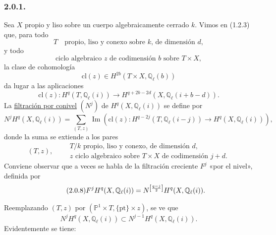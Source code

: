 \subsubsection*{2.0.1.}
Sea $X$ propio y liso sobre un cuerpo algebraicamente cerrado $k$. Vimos
en (1.2.3) que, para todo
\begin{equation}\tag{2.0.2}
T\quad\text{propio, liso y conexo sobre $k$, de dimensión $d$},
\end{equation}
y todo
\begin{equation}\tag{2.0.3}
\text{ciclo algebraico $z$ de codimensión $b$ sobre $T\times X$},
\end{equation}
la clase de cohomología
\begin{equation}\tag{2.0.4}
\mathrm{cl}(z)\in H^{2b}(T\times X,\mathbb Q_\ell(b))
\end{equation}
da lugar a las aplicaciones
\begin{equation}\tag{2.0.5}
\mathrm{cl}(z):H^q(T,\mathbb Q_\ell(i))\longrightarrow
H^{q+2b-2d}(X,\mathbb Q_\ell(i+b-d)).
\end{equation}
La \underline{filtración por conivel} $(N^j)$ de
$H^q(X,\mathbb Q_\ell(i))$ se define por
\begin{equation}\tag{2.0.6}
N^jH^q(X,\mathbb Q_\ell(i))
=\sum_{(T,z)}\operatorname{Im}\!\left(
\mathrm{cl}(z):H^{q-2j}(T,\mathbb Q_\ell(i-j))
\longrightarrow H^q(X,\mathbb Q_\ell(i))\right),
\end{equation}
donde la suma se extiende a los pares
\begin{equation}\tag{2.0.7}
(T,z),\qquad
\begin{array}{l}
T/k\text{ propio, liso y conexo, de dimensión }d,\\
z\text{ ciclo algebraico sobre }T\times X\text{ de codimensión }j+d.
\end{array}
\end{equation}
Conviene observar que a veces se habla de la filtración creciente $F^j$
«por el nivel», definida por
\begin{equation}\tag{2.0.8}
F^jH^q(X,\mathbb Q_\ell(i))
=N^{\left[\frac{\sisi{g}{q}-j}{2}\right]}H^q(X,\mathbb Q_\ell(i)).
\end{equation}

\pageoriginale

Reemplazando $(T,z)$ por
$(\mathbb P^1\times T,\{\mathrm{pt}\}\times z)$, se ve que
\begin{equation}\tag{2.0.9}
N^jH^q(X,\mathbb Q_\ell(i))
\subset N^{j-1}H^q(X,\mathbb Q_\ell(i)).
\end{equation}
Evidentemente se tiene:

